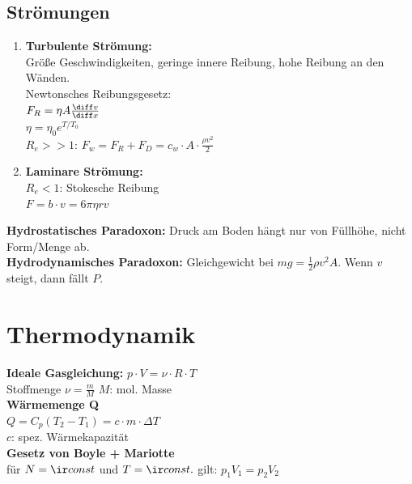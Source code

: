 \documentclass[german]{latex4ei/latex4ei_sheet}
\begin{document}
\subsection{Strömungen}
\begin{enumerate}
	\item \textbf{Turbulente Strömung:} \\
		Größe Geschwindigkeiten, geringe innere Reibung, hohe Reibung an den Wänden.\\
			Newtonsches Reibungsgesetz:\\
			$F_R=\eta A \frac{\diff v}{\diff x}$\\
			$\eta=\eta_0e^{T/T_0}$ \\
			$R_e >> 1$: $F_w=F_R+F_D=c_w \cdot A \cdot \frac{\rho v^2}{2}$
	\item \textbf{Laminare Strömung:} \\
			$R_e<1$: Stokesche Reibung\\
			$F=b\cdot v = 6\pi \eta r v$
\end{enumerate}
\textbf{Hydrostatisches Paradoxon:} Druck am Boden hängt nur von Füllhöhe, nicht Form/Menge ab.\\
\textbf{Hydrodynamisches Paradoxon:} Gleichgewicht bei $mg=\frac{1}{2}\rho v^2 A$. Wenn $v$ steigt, dann fällt $P$.


\section{Thermodynamik}

\textbf{Ideale Gasgleichung:} 
$p \cdot V = \nu \cdot R \cdot T$\\
Stoffmenge $\nu = \frac{m}{M}$ \qquad $M$: mol. Masse\\
\textbf{Wärmemenge Q} \\
$Q=C_p(T_2-T_1)=c \cdot m \cdot \Delta T$ \\ $c$: spez. Wärmekapazität \\

\textbf{Gesetz von Boyle + Mariotte} \\
für $N=\ir const$ und $T=\ir const.$ gilt: $p_1V_1=p_2V_2$ \\
\end{document}
